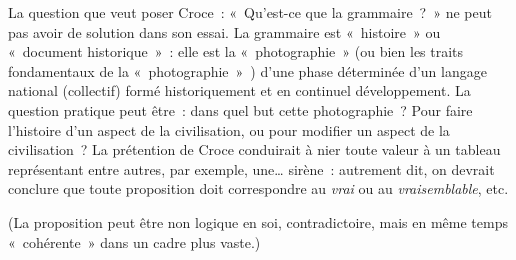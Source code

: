 \documentclass[french,twoside]{book} %
\begin{document}
La question que veut poser Croce : « Qu'est-ce que la grammaire ? » ne peut pas avoir de solution dans son essai. La grammaire est « histoire » ou « document historique » : elle est la « photographie » (ou bien les traits fondamentaux de la « photographie » ) d’une phase déterminée d’un langage national (collectif) formé historiquement et en continuel développement. La question pratique peut être : dans quel but cette photographie ? Pour faire l’histoire d’un aspect de la civilisation, ou pour modifier un aspect de la civilisation ? La prétention de Croce conduirait à nier toute valeur à un tableau représentant entre autres, par exemple, une… sirène : autrement dit, on devrait conclure que toute proposition doit correspondre au \emph{vrai} ou au \emph{vraisemblable}, etc.\par
(La proposition peut être non logique en soi, contradictoire, mais en même temps « cohérente » dans un cadre plus vaste.)
\end{document}

